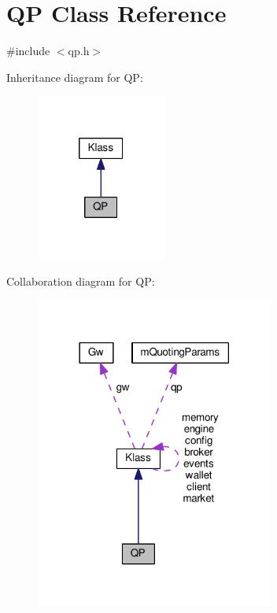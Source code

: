 \hypertarget{class_k_1_1_q_p}{}\section{QP Class Reference}
\label{class_k_1_1_q_p}


{\ttfamily \#include $<$qp.\+h$>$}



Inheritance diagram for QP\+:
\nopagebreak
\begin{figure}[H]
\begin{center}
\leavevmode
\includegraphics[width=121pt]{class_k_1_1_q_p__inherit__graph}
\end{center}
\end{figure}


Collaboration diagram for QP\+:
\nopagebreak
\begin{figure}[H]
\begin{center}
\leavevmode
\includegraphics[width=222pt]{class_k_1_1_q_p__coll__graph}
\end{center}
\end{figure}
